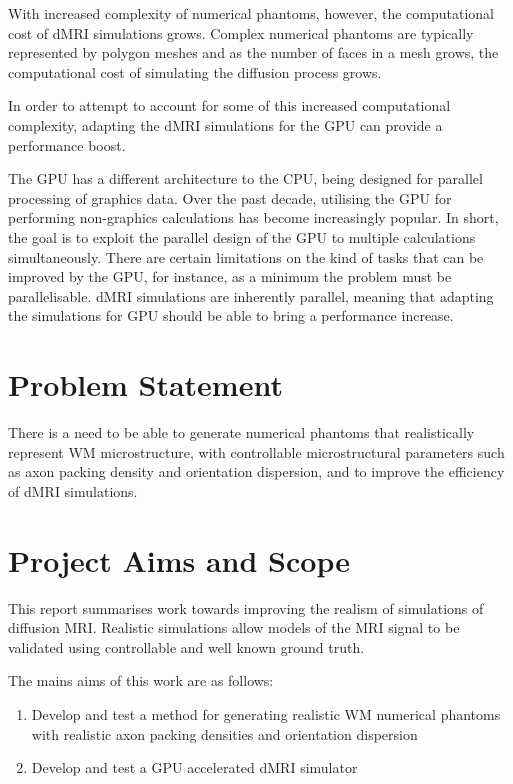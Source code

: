 With increased complexity of numerical phantoms, however, the computational cost of \ac{dMRI} simulations grows. Complex numerical phantoms are typically represented by polygon meshes and as the number of faces in a mesh grows, the computational cost of simulating the diffusion process grows.

In order to attempt to account for some of this increased computational complexity, adapting the \ac{dMRI} simulations for the \ac{GPU} can provide a performance boost.

The \ac{GPU} has a different architecture to the \ac{CPU}, being designed for parallel processing of graphics data.
Over the past decade, utilising the GPU for performing non-graphics calculations has become increasingly popular. 
In short, the goal is to exploit the parallel design of the \ac{GPU} to multiple calculations simultaneously.
There are certain limitations on the kind of tasks that can be improved by the \ac{GPU}, for instance, as a minimum the problem must be parallelisable.
\ac{dMRI} simulations are inherently parallel, meaning that adapting the simulations for \ac{GPU} should be able to bring a performance increase. 

\section{Problem Statement}
\label{sec:intro_problem_statement}
There is a need to be able to generate numerical phantoms that realistically represent \ac{WM} microstructure, with controllable microstructural parameters such as axon packing density and orientation dispersion, and to improve the efficiency of \ac{dMRI} simulations.


\section{Project Aims and Scope}
\label{sec:intro_project_aims}
This report summarises work towards improving the realism of simulations of diffusion \ac{MRI}. Realistic simulations allow models of the MRI signal to be validated using controllable and well known ground truth.

 

The mains aims of this work are as follows:
\begin{enumerate}
\item Develop and test a method for generating realistic \ac{WM} numerical phantoms with realistic axon packing densities and orientation dispersion
\item Develop and test a \ac{GPU} accelerated \ac{dMRI} simulator
\end{enumerate}

